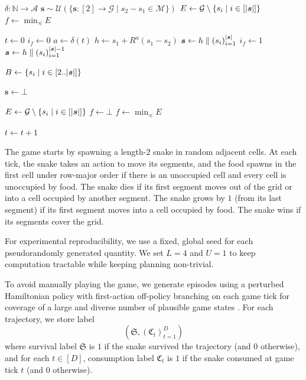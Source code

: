 \documentclass[10pt, twocolumn]{article}
\theoremstyle{definition}
\theoremstyle{remark}
\newcommand{\N}{\mathbb{N}}
\begin{document}
\begin{algorithm}[H]
\caption{$\textsc{Simulate}(\delta)$}
\begin{algorithmic}
	\Require $\delta:\N\to\mathcal{A}$
	\State ${
		\bm{s}
		\sim
		\mathcal{U}(
			\{
				\bm{s}
				:
				[2]
				\to
				\mathcal{G}
				\mid
				s_{2}-s_{1}
				\in
				\mathcal{M}
			\}
		)
	}$
	\State ${
		E
		\gets
		\mathcal{G}
		\setminus
		\{
			s_{i}
			\mid
			i\in[\abs{\bm{s}}]
		\}
	}$
	\State $f\gets\min_{\preceq}E$

	\State $t\gets 0$
		\State $i_{f}\gets 0$
		\State $a\gets\delta(t)$
		\State $h\gets s_{1}+R^{a}(s_{1}-s_{2})$
			\State ${
				\bm{s}
				\gets
				h
				\parallel
				(s_{i})_{i=1}^{\abs{\bm{s}}}
			}$
			\State $i_{f}\gets 1$
		\Else{}
			\State ${
				\bm{s}
				\gets
				h
				\parallel
				(s_{i})_{i=1}^{\abs{\bm{s}}-1}
			}$
		\EndIf

		\State ${
			B
			\gets
			\{
				s_{i}
				\mid
				i\in[2..\abs{\bm{s}}]
			\}
		}$

			\State $\bm{s}\gets\mathord{\perp}$
		\EndIf

			\State ${
				E
				\gets
				\mathcal{G}
				\setminus
				\mleft\{
					s_{i}
					\mid
					i\in[\abs{\bm{s}}]
				\mright\}
			}$
				\State $f\gets\mathord{\perp}$
			\Else{}
				\State $f\gets\min_{\preceq}E$
			\EndIf
		\EndIf

		\State $t\gets t+1$
	\EndWhile
\end{algorithmic}
\end{algorithm}

The game starts by spawning a length-$2$ snake in random adjacent cells.
At each tick, the snake takes an action to move its segments,
and the food spawns in the first cell under row-major order if there is an unoccupied cell and every cell is unoccupied by food.
The snake dies if its first segment moves out of the grid or into a cell occupied by another segment.
The snake grows by $1$ (from its last segment) if its first segment moves into a cell occupied by food.
The snake wins if its segments cover the grid.

For experimental reproducibility, we use a fixed, global seed for each pseudorandomly generated quantity.
We set $L=4$ and $U=1$ to keep computation tractable
while keeping planning non-trivial.

To avoid manually playing the game,
we generate episodes using a perturbed Hamiltonian policy
with first-action off-policy branching on each game tick for coverage of a large and diverse number of plausible game states \citep{tapsell2015snake}.
For each trajectory, we store label
$$
(\mathfrak{S},(\mathfrak{C}_{t})_{t=1}^{D})
$$
where survival label $\mathfrak{S}$ is $1$
if the snake survived the trajectory (and $0$ otherwise),
and for each $t\in[D]$, consumption label $\mathfrak{C}_{t}$ is $1$
if the snake consumed at game tick $t$ (and $0$ otherwise).
\end{document}
